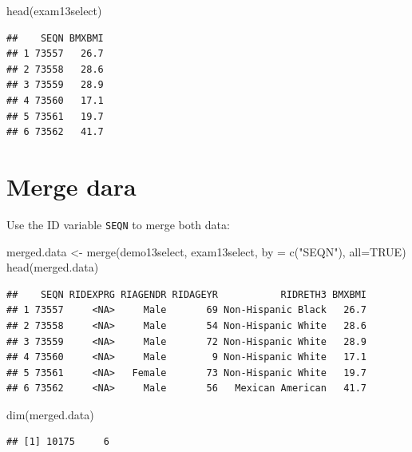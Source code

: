 \documentclass[
]{book}
\newenvironment{Shaded}{\begin{snugshade}}{\end{snugshade}}
\newcommand{\AttributeTok}[1]{\textcolor[rgb]{0.77,0.63,0.00}{#1}}
\newcommand{\ConstantTok}[1]{\textcolor[rgb]{0.00,0.00,0.00}{#1}}
\newcommand{\FunctionTok}[1]{\textcolor[rgb]{0.00,0.00,0.00}{#1}}
\newcommand{\NormalTok}[1]{#1}
\newcommand{\OtherTok}[1]{\textcolor[rgb]{0.56,0.35,0.01}{#1}}
\newcommand{\StringTok}[1]{\textcolor[rgb]{0.31,0.60,0.02}{#1}}
\begin{document}
\begin{Shaded}
\begin{Highlighting}[]
\FunctionTok{head}\NormalTok{(exam13select)}
\end{Highlighting}
\end{Shaded}

\begin{verbatim}
##    SEQN BMXBMI
## 1 73557   26.7
## 2 73558   28.6
## 3 73559   28.9
## 4 73560   17.1
## 5 73561   19.7
## 6 73562   41.7
\end{verbatim}

\hypertarget{merge-dara}{%
\section{Merge dara}\label{merge-dara}}

Use the ID variable \texttt{SEQN} to merge both data:

\begin{Shaded}
\begin{Highlighting}[]
\NormalTok{merged.data }\OtherTok{\textless{}{-}} \FunctionTok{merge}\NormalTok{(demo13select, exam13select, }
                     \AttributeTok{by =} \FunctionTok{c}\NormalTok{(}\StringTok{"SEQN"}\NormalTok{), }\AttributeTok{all=}\ConstantTok{TRUE}\NormalTok{)}
\FunctionTok{head}\NormalTok{(merged.data)}
\end{Highlighting}
\end{Shaded}

\begin{verbatim}
##    SEQN RIDEXPRG RIAGENDR RIDAGEYR           RIDRETH3 BMXBMI
## 1 73557     <NA>     Male       69 Non-Hispanic Black   26.7
## 2 73558     <NA>     Male       54 Non-Hispanic White   28.6
## 3 73559     <NA>     Male       72 Non-Hispanic White   28.9
## 4 73560     <NA>     Male        9 Non-Hispanic White   17.1
## 5 73561     <NA>   Female       73 Non-Hispanic White   19.7
## 6 73562     <NA>     Male       56   Mexican American   41.7
\end{verbatim}

\begin{Shaded}
\begin{Highlighting}[]
\FunctionTok{dim}\NormalTok{(merged.data)}
\end{Highlighting}
\end{Shaded}

\begin{verbatim}
## [1] 10175     6
\end{verbatim}
\end{document}
